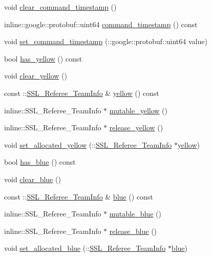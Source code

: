 \begin{DoxyCompactItemize}
\item 
void \hyperlink{class_s_s_l___referee_a3851678dce7df8244de37e54ce8a5a85}{clear\-\_\-command\-\_\-timestamp} ()
\item 
inline\-::google\-::protobuf\-::uint64 \hyperlink{class_s_s_l___referee_a0e66045edc99db142d40b4a2fa10658b}{command\-\_\-timestamp} () const 
\item 
void \hyperlink{class_s_s_l___referee_addb431e689893b7b498598b7329500d3}{set\-\_\-command\-\_\-timestamp} (\-::google\-::protobuf\-::uint64 value)
\item 
bool \hyperlink{class_s_s_l___referee_ace9e9ec7399a9c030f104ba6fe9cb286}{has\-\_\-yellow} () const 
\item 
void \hyperlink{class_s_s_l___referee_a62030580a014b1fa2ed70e14be9f879a}{clear\-\_\-yellow} ()
\item 
const \-::\hyperlink{class_s_s_l___referee___team_info}{S\-S\-L\-\_\-\-Referee\-\_\-\-Team\-Info} \& \hyperlink{class_s_s_l___referee_a9c58a6712fc2c109b89955b5c547df5f}{yellow} () const 
\item 
inline\-::\-S\-S\-L\-\_\-\-Referee\-\_\-\-Team\-Info $\ast$ \hyperlink{class_s_s_l___referee_abb4d63e840eb7e539970cc72e25ee56d}{mutable\-\_\-yellow} ()
\item 
inline\-::\-S\-S\-L\-\_\-\-Referee\-\_\-\-Team\-Info $\ast$ \hyperlink{class_s_s_l___referee_a8609efe5135ebc0c49bf2d1dd6b93427}{release\-\_\-yellow} ()
\item 
void \hyperlink{class_s_s_l___referee_a41f5b80c78267e89f571a9f96571f380}{set\-\_\-allocated\-\_\-yellow} (\-::\hyperlink{class_s_s_l___referee___team_info}{S\-S\-L\-\_\-\-Referee\-\_\-\-Team\-Info} $\ast$\hyperlink{class_s_s_l___referee_a9c58a6712fc2c109b89955b5c547df5f}{yellow})
\item 
bool \hyperlink{class_s_s_l___referee_a38296d5d97af44f31625f2fdc33de19d}{has\-\_\-blue} () const 
\item 
void \hyperlink{class_s_s_l___referee_a4716192da5b686b04e84d5bcc893bb25}{clear\-\_\-blue} ()
\item 
const \-::\hyperlink{class_s_s_l___referee___team_info}{S\-S\-L\-\_\-\-Referee\-\_\-\-Team\-Info} \& \hyperlink{class_s_s_l___referee_a5a322ae2a2895fb24fedb4921a29aa60}{blue} () const 
\item 
inline\-::\-S\-S\-L\-\_\-\-Referee\-\_\-\-Team\-Info $\ast$ \hyperlink{class_s_s_l___referee_af4d78047aaacace7ce25d7608c2d30bb}{mutable\-\_\-blue} ()
\item 
inline\-::\-S\-S\-L\-\_\-\-Referee\-\_\-\-Team\-Info $\ast$ \hyperlink{class_s_s_l___referee_a23f4d2749138c90d243c513245107dac}{release\-\_\-blue} ()
\item 
void \hyperlink{class_s_s_l___referee_a5aa86bb912b9805bd25ee3dd02925bdd}{set\-\_\-allocated\-\_\-blue} (\-::\hyperlink{class_s_s_l___referee___team_info}{S\-S\-L\-\_\-\-Referee\-\_\-\-Team\-Info} $\ast$\hyperlink{class_s_s_l___referee_a5a322ae2a2895fb24fedb4921a29aa60}{blue})
\end{DoxyCompactItemize}
